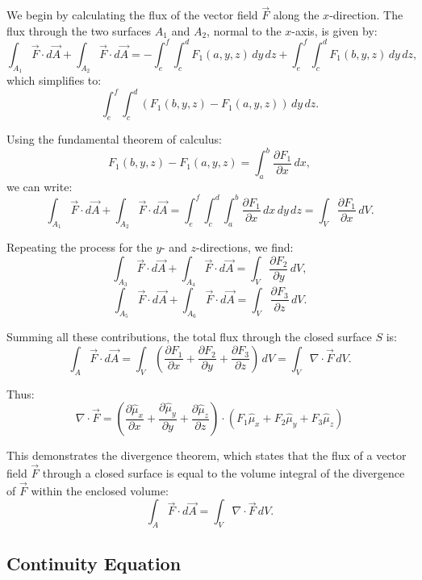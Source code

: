 \documentclass[a4paper]{article}
\begin{document}
We begin by calculating the flux of the vector field \(\vec{F}\) along the \(x\)-direction. The flux through the two surfaces \(A_1\) and \(A_2\), normal to the \(x\)-axis, is given by:
\[
\int_{A_1} \vec{F} \cdot d\vec{A} + \int_{A_2} \vec{F} \cdot d\vec{A} = -\int_e^f \int_c^d F_1(a, y, z) \, dy \, dz + \int_e^f \int_c^d F_1(b, y, z) \, dy \, dz,
\]
which simplifies to:
\[
\int_e^f \int_c^d \left(F_1(b, y, z) - F_1(a, y, z)\right) \, dy \, dz.
\]

Using the fundamental theorem of calculus:
\[
F_1(b, y, z) - F_1(a, y, z) = \int_a^b \frac{\partial F_1}{\partial x} \, dx,
\]
we can write:
\[
\int_{A_1} \vec{F} \cdot d\vec{A} + \int_{A_2} \vec{F} \cdot d\vec{A} = \int_e^f \int_c^d \int_a^b \frac{\partial F_1}{\partial x} \, dx \, dy \, dz = \int_V \frac{\partial F_1}{\partial x} \, dV.
\]



Repeating the process for the \(y\)- and \(z\)-directions, we find:
\[
\int_{A_3} \vec{F} \cdot d\vec{A} + \int_{A_4} \vec{F} \cdot d\vec{A} = \int_V \frac{\partial F_2}{\partial y} \, dV,
\]
\[
\int_{A_5} \vec{F} \cdot d\vec{A} + \int_{A_6} \vec{F} \cdot d\vec{A} = \int_V \frac{\partial F_3}{\partial z} \, dV.
\]

Summing all these contributions, the total flux through the closed surface \(S\) is:
\[
\int_A \vec{F} \cdot d\vec{A} = \int_V \left( \frac{\partial F_1}{\partial x} + \frac{\partial F_2}{\partial y} + \frac{\partial F_3}{\partial z} \right) \, dV = \int_V \nabla \cdot \vec{F} \, dV.
\]

Thus: \[
\nabla \cdot \vec{F} = 
\left( 
\frac{\partial \hat{\mu}_x}{\partial x} + 
\frac{\partial \hat{\mu}_y}{\partial y} + 
\frac{\partial \hat{\mu}_z}{\partial z} 
\right) \cdot 
\left( 
F_1 \hat{\mu}_x + 
F_2 \hat{\mu}_y + 
F_3 \hat{\mu}_z 
\right)
\]

This demonstrates the divergence theorem, which states that the flux of a vector field \(\vec{F}\) through a closed surface is equal to the volume integral of the divergence of \(\vec{F}\) within the enclosed volume:
\[
\int_A \vec{F} \cdot d\vec{A} = \int_V \nabla \cdot \vec{F} \, dV.
\]

\subsection{Continuity Equation}
\end{document}
